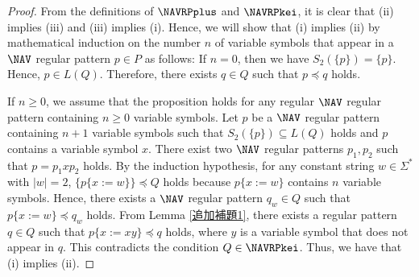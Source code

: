 \begin{proof}
From the definitions of $\NAVRPplus$ and $\NAVRPkei$, it is clear that (ii) implies (iii)  and  (iii) implies (i).
Hence, we will show that (i) implies (ii) 
by mathematical induction on the number $n$ of variable symbols that appear in a $\NAV$ regular pattern $p\in P$ as follows:
%
If $n=0$, then we have $S_{2}(\{p\})= \{ p \}$.
Hence, $p \in L(Q)$.
Therefore, there exists $q \in Q$ such that $p \preceq q$ holds.

If $n \ge 0$, we assume that the proposition holds for any regular $\NAV$ regular pattern containing $n \ge 0$ variable symbols.
Let $p$ be a $\NAV$ regular pattern containing $n+1$ variable symbols such that $S_{2}(\{p\}) \subseteq L(Q)$ holds and $p$ contains a variable symbol $x$.
There exist two $\NAV$ regular patterns $p_{1},p_{2}$ such that $p=p_{1}xp_{2}$ holds.
By the induction hypothesis, for any constant string $w\in \Sigma^{\ast}$ with $|w|=2$, $\{p\{x:=w\}\}\preceq Q$ holds because $p\{x:=w\}$ contains $n$ variable symbols.
Hence, there exists a $\NAV$ regular pattern $q_{w} \in Q$ such that $p \{ x:=w \} \preceq q_{w}$ holds.
From Lemma \ref{追加補題1}, there exists a regular pattern $q \in Q$ such that $p \{ x:=xy \} \preceq q$ holds, where $y$ is a variable symbol that does not appear in $q$.
This contradicts the condition $Q \in \NAVRPkei$.
%
Thus, we have that (i) implies (ii).
\end{proof}


